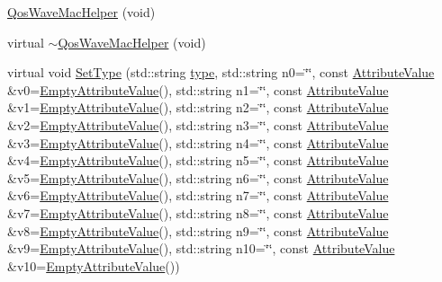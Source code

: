 \begin{DoxyCompactItemize}
\item 
\hyperlink{classns3_1_1QosWaveMacHelper_a5a1211c0be31f54a6b3f9618bf9fba4c}{Qos\+Wave\+Mac\+Helper} (void)
\item 
virtual \hyperlink{classns3_1_1QosWaveMacHelper_a15c11896f2ed21d7ce8ac80e250e3f40}{$\sim$\+Qos\+Wave\+Mac\+Helper} (void)
\item 
virtual void \hyperlink{classns3_1_1QosWaveMacHelper_a010cf72e8f30cf32eb995b398e44de47}{Set\+Type} (std\+::string \hyperlink{visualizer-ideas_8txt_add98db9e15e2a58cf2b57623e7aa893a}{type}, std\+::string n0=\char`\"{}\char`\"{}, const \hyperlink{classns3_1_1AttributeValue}{Attribute\+Value} \&v0=\hyperlink{classns3_1_1EmptyAttributeValue}{Empty\+Attribute\+Value}(), std\+::string n1=\char`\"{}\char`\"{}, const \hyperlink{classns3_1_1AttributeValue}{Attribute\+Value} \&v1=\hyperlink{classns3_1_1EmptyAttributeValue}{Empty\+Attribute\+Value}(), std\+::string n2=\char`\"{}\char`\"{}, const \hyperlink{classns3_1_1AttributeValue}{Attribute\+Value} \&v2=\hyperlink{classns3_1_1EmptyAttributeValue}{Empty\+Attribute\+Value}(), std\+::string n3=\char`\"{}\char`\"{}, const \hyperlink{classns3_1_1AttributeValue}{Attribute\+Value} \&v3=\hyperlink{classns3_1_1EmptyAttributeValue}{Empty\+Attribute\+Value}(), std\+::string n4=\char`\"{}\char`\"{}, const \hyperlink{classns3_1_1AttributeValue}{Attribute\+Value} \&v4=\hyperlink{classns3_1_1EmptyAttributeValue}{Empty\+Attribute\+Value}(), std\+::string n5=\char`\"{}\char`\"{}, const \hyperlink{classns3_1_1AttributeValue}{Attribute\+Value} \&v5=\hyperlink{classns3_1_1EmptyAttributeValue}{Empty\+Attribute\+Value}(), std\+::string n6=\char`\"{}\char`\"{}, const \hyperlink{classns3_1_1AttributeValue}{Attribute\+Value} \&v6=\hyperlink{classns3_1_1EmptyAttributeValue}{Empty\+Attribute\+Value}(), std\+::string n7=\char`\"{}\char`\"{}, const \hyperlink{classns3_1_1AttributeValue}{Attribute\+Value} \&v7=\hyperlink{classns3_1_1EmptyAttributeValue}{Empty\+Attribute\+Value}(), std\+::string n8=\char`\"{}\char`\"{}, const \hyperlink{classns3_1_1AttributeValue}{Attribute\+Value} \&v8=\hyperlink{classns3_1_1EmptyAttributeValue}{Empty\+Attribute\+Value}(), std\+::string n9=\char`\"{}\char`\"{}, const \hyperlink{classns3_1_1AttributeValue}{Attribute\+Value} \&v9=\hyperlink{classns3_1_1EmptyAttributeValue}{Empty\+Attribute\+Value}(), std\+::string n10=\char`\"{}\char`\"{}, const \hyperlink{classns3_1_1AttributeValue}{Attribute\+Value} \&v10=\hyperlink{classns3_1_1EmptyAttributeValue}{Empty\+Attribute\+Value}())
\end{DoxyCompactItemize}
